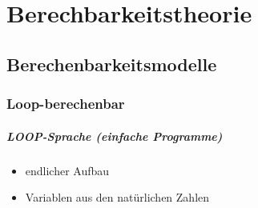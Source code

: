 \documentclass{lehramt-informatik-haupt}
\begin{document}

\chapter{Berechbarkeitstheorie}

\begin{liQuellen}
\item \cite[Seite 253-340]{hoffmann}
\end{liQuellen}

\section{Berechenbarkeitsmodelle}

%


\subsection{Loop-berechenbar}

\begin{liQuellen}
\item \cite[Seite 7-11]{theo:fs:4}
\item \cite[Seite 254-260]{hoffmann}
\item \cite{wiki:loop}
\end{liQuellen}

\paragraph{LOOP-Sprache (einfache Programme)}

\begin{itemize}
\item endlicher Aufbau
\item Variablen aus den natürlichen Zahlen
\end{itemize}
\end{document}
